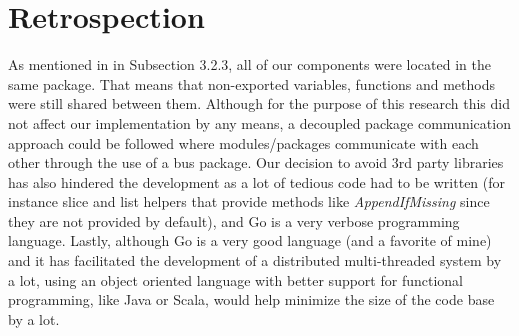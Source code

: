 \documentclass[12pt,a4paper]{report}
\begin{document}
		\section{Retrospection}
		As mentioned in in Subsection 3.2.3, all of our components were located in the same package. That means that non-exported variables, functions and methods were still shared between them. Although for the purpose of this research this did not affect our implementation by any means, a decoupled package communication approach could be followed where modules/packages communicate with each other through the use of a bus package. Our decision to avoid 3rd party libraries has also hindered the development as a lot of tedious code had to be written (for instance slice and list helpers that provide methods like \textit{AppendIfMissing} since they are not provided by default), and Go is a very verbose programming language. Lastly, although Go is a very good language (and a favorite of mine) and it has facilitated the development of a distributed multi-threaded system by a lot, using an object oriented language with better support for functional programming, like Java or Scala, would help minimize the size of the code base by a lot.
	\newpage

	
	
\end{document}
